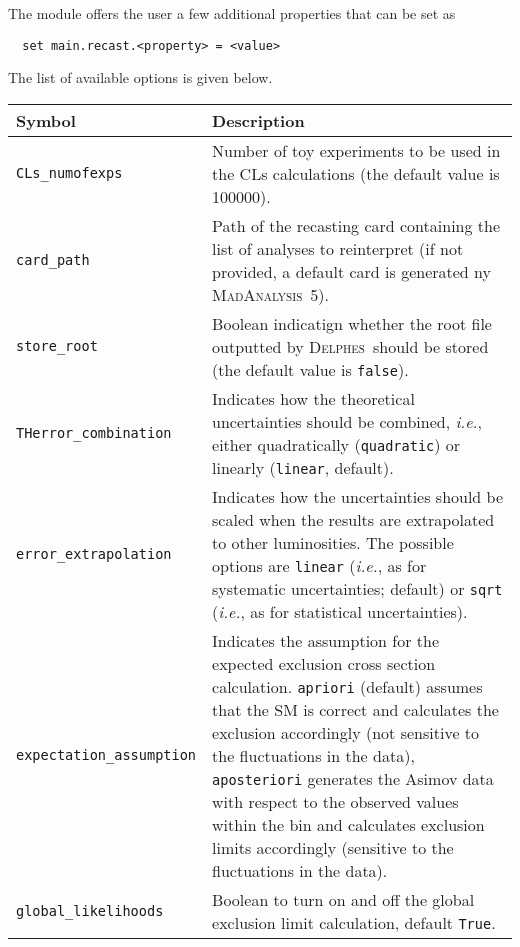 \documentclass[a4paper]{article}
\newcommand{\MA}{\textsc{MadAnalysis}~5}
\newcommand{\DEL}{\textsc{Delphes}}
\newcommand{\ie}{\textit{i.e.}}
\begin{document}
\noindent The module offers the user a few additional properties that can be set
as
{\color{ao} \begin{verbatim}
  set main.recast.<property> = <value>
\end{verbatim}}
The list of available options is given below.
\renewcommand{\arraystretch}{1.2}%
\begin{center}\begin{tabular}{l p{8.4cm}}
\hline
  Symbol& Description\\
  \hline
  \color{ao} \verb?CLs_numofexps? & Number of toy experiments to be used in the
    CLs calculations (the default value is 100000). \\
  \color{ao} \verb?card_path?     & Path of the recasting card containing the
    list of analyses to reinterpret (if not provided, a default card is
    generated ny \MA).\\
  \color{ao} \verb?store_root?    & Boolean indicatign whether the root file
    outputted by \DEL\ should be stored (the default value is \verb|false|).\\
  \color{ao} \verb?THerror_combination? & Indicates how the theoretical
    uncertainties should be combined, \ie, either quadratically
    (\verb|quadratic|) or linearly (\verb|linear|, default).\\
  \color{ao} \verb?error_extrapolation? & Indicates how the uncertainties should
    be scaled when the results are extrapolated to other luminosities. The
    possible options are \verb|linear| (\ie, as for systematic uncertainties;
    default) or \verb|sqrt| (\ie, as for statistical uncertainties).\\
  \color{ao} \verb?expectation_assumption? & Indicates the assumption for the expected exclusion cross section calculation. \texttt{apriori} (default) assumes that the SM is correct and calculates the exclusion accordingly (not sensitive to the fluctuations in the data), \texttt{aposteriori} generates the Asimov data with respect to the observed values within the bin and calculates exclusion limits accordingly (sensitive to the fluctuations in the data).\\
  \color{ao} \verb?global_likelihoods? & Boolean to turn on and off the global exclusion limit calculation, default \texttt{True}.\\
\hline
\end{tabular}
\end{center}




\newpage
 

\end{document}
